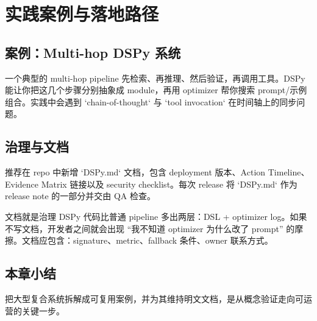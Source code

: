 \section{实践案例与落地路径}

\subsection{案例：Multi-hop DSPy 系统}

一个典型的 multi-hop pipeline 先检索、再推理、然后验证，再调用工具。DSPy 能让你把这几个步骤分别抽象成 module，再用 optimizer 帮你搜索 prompt/示例组合。实践中会遇到 `chain-of-thought` 与 `tool invocation` 在时间轴上的同步问题。

\subsection{治理与文档}

推荐在 repo 中新增 `DSPy.md` 文档，包含 deployment 版本、Action Timeline、Evidence Matrix 链接以及 security checklist。每次 release 将 `DSPy.md` 作为 release note 的一部分并交由 QA 检查。

\begin{importantbox}{文档就是治理}
DSPy 代码比普通 pipeline 多出两层：DSL + optimizer log。如果不写文档，开发者之间就会出现 ``我不知道 optimizer 为什么改了 prompt'' 的摩擦。文档应包含：signature、metric、fallback 条件、owner 联系方式。
\end{importantbox}

\subsection{本章小结}

把大型复合系统拆解成可复用案例，并为其维持明文文档，是从概念验证走向可运营的关键一步。

